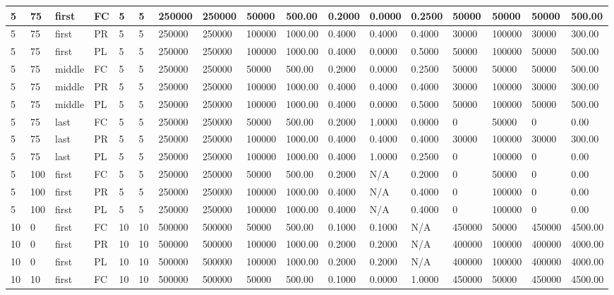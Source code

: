 \begin{tabular}{|l|l|l|l|l|l|l|l|l|l|l|l|l|l|l|l|l|}
5 & 75 & first & FC & 5 & 5 & 250000 & 250000 & 50000 & 500.00 & 0.2000 & 0.0000 & 0.2500 & 50000 & 50000 & 50000 & 500.00 \\ \hline
5 & 75 & first & PR & 5 & 5 & 250000 & 250000 & 100000 & 1000.00 & 0.4000 & 0.4000 & 0.4000 & 30000 & 100000 & 30000 & 300.00 \\ \hline
5 & 75 & first & PL & 5 & 5 & 250000 & 250000 & 100000 & 1000.00 & 0.4000 & 0.0000 & 0.5000 & 50000 & 100000 & 50000 & 500.00 \\ \hline
5 & 75 & middle & FC & 5 & 5 & 250000 & 250000 & 50000 & 500.00 & 0.2000 & 0.0000 & 0.2500 & 50000 & 50000 & 50000 & 500.00 \\ \hline
5 & 75 & middle & PR & 5 & 5 & 250000 & 250000 & 100000 & 1000.00 & 0.4000 & 0.4000 & 0.4000 & 30000 & 100000 & 30000 & 300.00 \\ \hline
5 & 75 & middle & PL & 5 & 5 & 250000 & 250000 & 100000 & 1000.00 & 0.4000 & 0.0000 & 0.5000 & 50000 & 100000 & 50000 & 500.00 \\ \hline
5 & 75 & last & FC & 5 & 5 & 250000 & 250000 & 50000 & 500.00 & 0.2000 & 1.0000 & 0.0000 & 0 & 50000 & 0 & 0.00 \\ \hline
5 & 75 & last & PR & 5 & 5 & 250000 & 250000 & 100000 & 1000.00 & 0.4000 & 0.4000 & 0.4000 & 30000 & 100000 & 30000 & 300.00 \\ \hline
5 & 75 & last & PL & 5 & 5 & 250000 & 250000 & 100000 & 1000.00 & 0.4000 & 1.0000 & 0.2500 & 0 & 100000 & 0 & 0.00 \\ \hline
5 & 100 & first & FC & 5 & 5 & 250000 & 250000 & 50000 & 500.00 & 0.2000 & N/A & 0.2000 & 0 & 50000 & 0 & 0.00 \\ \hline
5 & 100 & first & PR & 5 & 5 & 250000 & 250000 & 100000 & 1000.00 & 0.4000 & N/A & 0.4000 & 0 & 100000 & 0 & 0.00 \\ \hline
5 & 100 & first & PL & 5 & 5 & 250000 & 250000 & 100000 & 1000.00 & 0.4000 & N/A & 0.4000 & 0 & 100000 & 0 & 0.00 \\ \hline
10 & 0 & first & FC & 10 & 10 & 500000 & 500000 & 50000 & 500.00 & 0.1000 & 0.1000 & N/A & 450000 & 50000 & 450000 & 4500.00 \\ \hline
10 & 0 & first & PR & 10 & 10 & 500000 & 500000 & 100000 & 1000.00 & 0.2000 & 0.2000 & N/A & 400000 & 100000 & 400000 & 4000.00 \\ \hline
10 & 0 & first & PL & 10 & 10 & 500000 & 500000 & 100000 & 1000.00 & 0.2000 & 0.2000 & N/A & 400000 & 100000 & 400000 & 4000.00 \\ \hline
10 & 10 & first & FC & 10 & 10 & 500000 & 500000 & 50000 & 500.00 & 0.1000 & 0.0000 & 1.0000 & 450000 & 50000 & 450000 & 4500.00 \\ \hline

\end{tabular}
